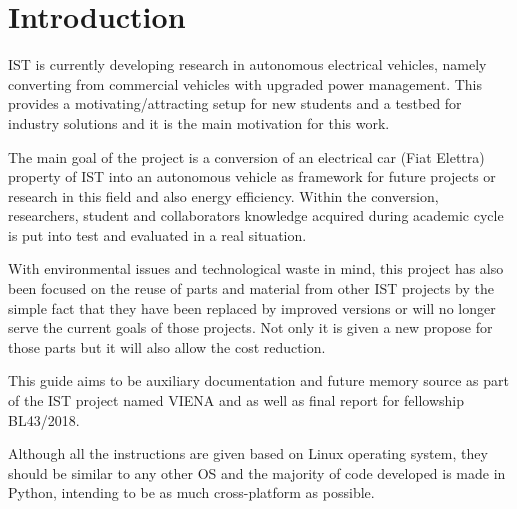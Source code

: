 
\chapter{Introduction}
\label{chapter:introduction}

\gls{IST} is currently developing research in autonomous electrical vehicles, namely converting from commercial vehicles with upgraded power management.
This provides a motivating/attracting setup for new students and a testbed for industry solutions and it is the main motivation for this work.

The main goal of the project is a conversion of an electrical car (Fiat Elettra) property of \gls{IST} into an autonomous vehicle as framework for future projects or research in this field and also energy efficiency. Within the conversion, researchers, student and collaborators knowledge acquired during academic cycle is put into test and evaluated in a real situation. 

With environmental issues and technological waste in mind, this project has
also been focused on the reuse of parts and material from
other \gls{IST} projects by the simple fact that they have been replaced by improved versions or will no longer serve the current goals of those projects. Not only it is given a new propose for those parts but it will also allow the cost reduction.

This guide aims to be auxiliary documentation and future memory source as part of the \gls{IST} project named \gls{VIENA} and as well as final report for fellowship BL43/2018. 

Although all the instructions are given based on Linux operating system, they should be similar to any other OS and the majority of code developed is made in Python, intending to be as much cross-platform as possible.




